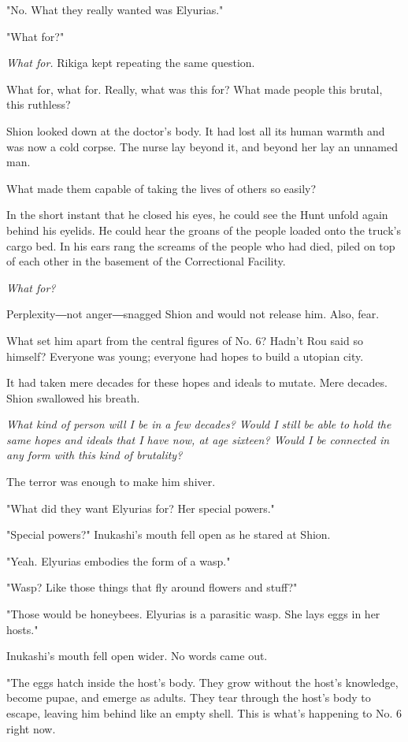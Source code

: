 "No. What they really wanted was Elyurias."

"What for?"

\emph{What for.} Rikiga kept repeating the same question.

What for, what for. Really, what was this for? What made people this
brutal, this ruthless?

Shion looked down at the doctor's body. It had lost all its human warmth
and was now a cold corpse. The nurse lay beyond it, and beyond her lay
an unnamed man.

What made them capable of taking the lives of others so easily?

In the short instant that he closed his eyes, he could see the Hunt
unfold again behind his eyelids. He could hear the groans of the people
loaded onto the truck's cargo bed. In his ears rang the screams of the
people who had died, piled on top of each other in the basement of the
Correctional Facility.

\emph{What for?}

Perplexity―not anger―snagged Shion and would not release him. Also,
fear.

What set him apart from the central figures of No. 6? Hadn't Rou said so
himself? Everyone was young; everyone had hopes to build a utopian city.

It had taken mere decades for these hopes and ideals to mutate. Mere
decades. Shion swallowed his breath.

\emph{What kind of person will I be in a few decades? Would I still be able to
hold the same hopes and ideals that I have now, at age sixteen? Would I
be connected in any form with this kind of brutality?}

The terror was enough to make him shiver.

"What did they want Elyurias for? Her special powers."

"Special powers?" Inukashi's mouth fell open as he stared at Shion.

"Yeah. Elyurias embodies the form of a wasp."

"Wasp? Like those things that fly around flowers and stuff?"

"Those would be honeybees. Elyurias is a parasitic wasp. She lays eggs
in her hosts."

Inukashi's mouth fell open wider. No words came out.

"The eggs hatch inside the host's body. They grow without the host's
knowledge, become pupae, and emerge as adults. They tear through the
host's body to escape, leaving him behind like an empty shell. This is
what's happening to No. 6 right now.

